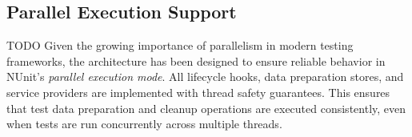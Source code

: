 \subsection{Parallel Execution Support}
TODO
Given the growing importance of parallelism in modern testing frameworks, the architecture has been designed to ensure reliable behavior in NUnit's \textit{parallel execution mode}. All lifecycle hooks, data preparation stores, and service providers are implemented with thread safety guarantees. This ensures that test data preparation and cleanup operations are executed consistently, even when tests are run concurrently across multiple threads.

